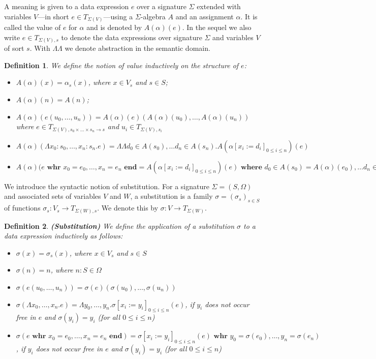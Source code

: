 \documentclass[a4paper,11pt]{article}
\newcommand{\Lambdabb}{\Lambda \!\! \Lambda}
\newtheorem{thdefinition}{Definition}[section]
\newenvironment{definition}
  {\begin{thdefinition}\em}
  {\end{thdefinition}}
\begin{document}
A meaning is given to a data expression $e$ over a signature $\Sigma$ extended with variables $V$---in short $e \in T_{\Sigma(V)}$---using a $\Sigma$-algebra $A$ and an assignment $\alpha$. It is called the value of $e$ for $\alpha$ and is denoted by $A(\alpha)(e)$. In the sequel we also write $e \in T_{\Sigma(V),s}$ to denote the data expressions over signature $\Sigma$ and variables $V$ of sort $s$. With $\Lambdabb$ we denote abstraction in the semantic domain.
\begin{definition}
We define the notion of value inductively on the structure of $e$:
\begin{itemize}
 \item $A(\alpha)(x) = \alpha_s(x)$, where $x \in V_s$ and $s \in S$;
 \item $A(\alpha)(n) = A(n)$; %
 \item $A(\alpha)(e(u_0, \dots, u_n)) = A(\alpha)(e)(A(\alpha)(u_0), \dots, A(\alpha)(u_n))$ where $e \in T_{\Sigma(V),s_0 \times \dots \times s_n \rightarrow s}$ and $u_i \in T_{\Sigma(V),s_i}$
 \item $A(\alpha)(\Lambda x_0{:}s_0, \dots, x_n{:}s_n . e) = \Lambdabb d_0 \in A(s_0), \dots d_n \in A(s_n) . A(\alpha[x_i := d_i]_{0 \leq i \leq n})(e)$
\item $A(\alpha)(e \textbf{ whr } x_0 = e_0, \dots, x_n = e_n \textbf{ end} = A(\alpha[x_i := d_i]_{0 \leq i \leq n})(e) \textbf{ where } d_0 \in A(s_0) = A(\alpha)(e_0), \dots d_n \in A(s_n) = A(\alpha)(e_n) \textbf{ end}$
\end{itemize}
\end{definition}

We introduce the syntactic notion of substitution. For a signature $\Sigma = (S, \Omega)$ and associated sets of variables $V$ and $W$, a substitution is a family $\sigma = (\sigma_s)_{s \in S}$ of functions $\sigma_s : V_s \rightarrow T_{\Sigma(W),s}$. We denote this by $\sigma : V \rightarrow T_{\Sigma(W)}$.
\begin{definition}\textbf{(Substitution)}
We define the application of a substitution $\sigma$ to a data expression inductively as follows:
\begin{itemize}
 \item $\sigma(x) = \sigma_s(x)$, where $x \in V_s$ and $s \in S$
 \item $\sigma(n) = n$, where $n : S \in \Omega$
 \item $\sigma(e(u_0, \dots, u_n)) = \sigma(e)(\sigma(u_0), \dots, \sigma(u_n))$
 \item $\sigma(\Lambda x_0, \dots, x_n . e) = \Lambda y_0, \dots, y_n . \sigma[x_i:=y_i]_{0 \leq i \leq n}(e)$, if $y_i$ does not occur free in $e$ and $\sigma(y_i) = y_i$ (for all $0 \leq i \leq n$)
 \item $\sigma(e \textbf{ whr } x_0 = e_0, \dots, x_n = e_n \textbf{ end}) = \sigma[x_i := y_i]_{0 \leq i \leq n}(e) \textbf{ whr } y_0 = \sigma(e_0), \dots, y_n = \sigma(e_n)$, if $y_i$ does not occur free in $e$ and $\sigma(y_i) = y_i$ (for all $0 \leq i \leq n$)
\end{itemize}
\end{definition}
\end{document}
